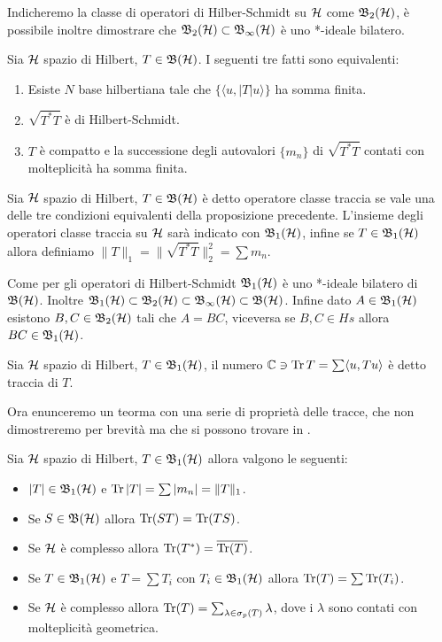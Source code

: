 Indicheremo la classe di operatori di Hilber-Schmidt su $\hi$ come $\Hs$, è possibile inoltre dimostrare che $\Hs \subset \Bo$ è uno *-ideale bilatero.

\begin{proposition}
    Sia $\hi$ spazio di Hilbert, $T\in \B$. I seguenti tre fatti sono equivalenti:
\begin{enumerate}
    \item Esiste $N$ base hilbertiana tale che $\{ \langle u, |T| u \rangle \}$ ha somma finita.
    \item $\sqrt{T^*T}$ è di Hilbert-Schmidt.
    \item $T$ è compatto e la successione degli autovalori $\{m_n\}$ di $\sqrt{T^*T}$ contati con molteplicità ha somma finita. 
\end{enumerate}
\end{proposition}

\begin{definition}
    Sia $\hi$ spazio di Hilbert, $T\in \B$ è detto operatore classe traccia se vale una delle tre condizioni equivalenti della proposizione precedente. L'insieme degli operatori classe traccia su $\hi$ sarà indicato con $\Ct$, infine se $T \in \Ct$ allora definiamo $\| T\|_1 = \| \sqrt{T^*T}\|_2^2= \sum m_n$.
\end{definition}

Come per gli operatori di Hilbert-Schmidt $\Ct$ è uno *-ideale bilatero di $\B$. Inoltre $\Ct \subset \Hs \subset \Bo \subset \B$. Infine dato $A\in \Ct$ esistono $B, C \in \Hs$ tali che $A = BC$, viceversa se $B,C \in Hs$ allora $BC \in \Ct$.  
\begin{definition}
    Sia $\hi$ spazio di Hilbert, $T\in \Ct$, il numero $\mathbb{C} \ni \Tr T = \sum \langle u, Tu \rangle$ è detto traccia di $T$.
\end{definition}

Ora enunceremo un teorma con una serie di proprietà delle tracce, che non dimostreremo per brevità ma che si possono trovare in \cite{Mor}.

\begin{theorem}
    Sia $\hi$ spazio di Hilbert, $T \in \Ct$ allora valgono le seguenti:
\begin{itemize}
    \item $|T| \in \Ct$ e $\Tr |T| = \sum |m_n|=\|T\|_1$.
    \item Se $S \in \B$ allora $\Tr(ST) = \Tr(TS)$.
    \item Se $\hi$ è complesso allora $\Tr(T^*) = \overline{\Tr(T)}$.
    \item Se $T \in \Ct$ e $T = \sum T_i$ con $T_i \in \Ct$ allora $\Tr(T) = \sum \Tr(T_i)$.
    \item Se $\hi$ è complesso allora $\Tr(T) = \sum_{\lambda \in \sigma_p(T)} \lambda$, dove i $\lambda$ sono contati con molteplicità geometrica. 
\end{itemize}
\end{theorem}

